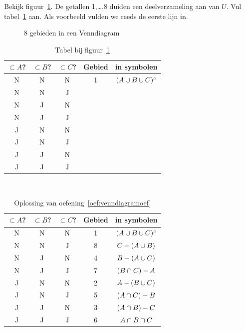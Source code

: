 \newpage
\begin{oef}
\label{oef:venndiagramoef}
Bekijk figuur~\ref{fig:venndiagramoef}. De getallen 1,\dots,8 duiden een deelverzameling aan van $U$. Vul  tabel~\ref{tab:venndiagram} aan. Als voorbeeld vulden we reeds de eerste lijn in.
\begin{figure}[htbp]
\centering

\caption{8 gebieden in een Venndiagram}
\label{fig:venndiagramoef}
\end{figure}
\begin{table}[h!tbp]
\centering
\caption{Tabel bij figuur~\ref{fig:venndiagramoef}}
\begin{tabular}{ccccc}
\toprule
$\subset A$? & $\subset B$? & $\subset C$? & Gebied & in symbolen \\ 
\midrule
N & N & N & 1  & $(A \cup B \cup C)^c$ \\ 
N & N & J &  &   \\ 
N & J & N &   &   \\ 
N & J & J &   &   \\ 
J & N & N &   &   \\ 
J & N & J &   &   \\ 
J & J & N &   &   \\ 
J & J & J &   &   \\ 
\bottomrule
\end{tabular} 
\label{tab:venndiagram}
\end{table}

\begin{opl}
$\qquad$ \\
\begin{table}[h!tbp]
\centering
\caption{Oplossing van oefening~\ref{oef:venndiagramoef}}
\begin{tabular}{ccccc}
\toprule
$\subset A$? & $\subset B$? & $\subset C$? & Gebied & in symbolen \\ 
\midrule
N & N & N & 1  & $(A\cup B \cup C)^c$ \\ 
N & N & J & 8 & $C-(A\cup B)$  \\ 
N & J & N &  4 & $B-(A\cup C)$  \\ 
N & J & J &7   &$(B\cap C)-A$   \\ 
J & N & N &  2 & $A-(B\cup C)$  \\ 
J & N & J & 5  & $(A\cap C)-B$  \\ 
J & J & N & 3  & $(A\cap B)-C$  \\ 
J & J & J & 6  & $A\cap B\cap C$  \\ 
\bottomrule
\end{tabular} 
\label{tab:venndiagram2}
\end{table}

\end{opl}
\end{oef}




